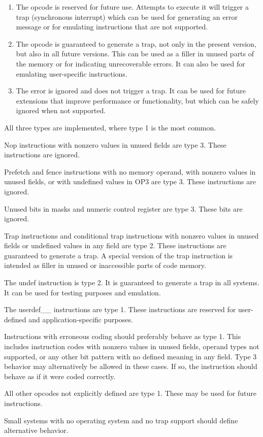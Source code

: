 \documentclass[forwardcom.tex]{subfiles}
\begin{document}
\begin{enumerate}
\item The opcode is reserved for future use. Attempts to execute it will trigger a trap (synchronous interrupt) which can be used for generating an error message or for emulating instructions that are not supported.
\item The opcode is guaranteed to generate a trap, not only in the present version, but also in all future versions. This can be used as a filler in unused parts of the memory or for indicating unrecoverable errors. It can also be used for emulating user-specific instructions.
\item The error is ignored and does not trigger a trap. It can be used for future extensions that improve performance or functionality, but which can be safely ignored when not supported.
\end{enumerate}

All three types are implemented, where type 1 is the most common.
\vspace{2mm}

Nop instructions with nonzero values in unused fields are type 3. These instructions are ignored.
\vspace{2mm}

Prefetch and fence instructions with no memory operand, with nonzero values in unused fields, or with undefined values in OP3 are type 3. These instructions are ignored.
\vspace{2mm}

Unused bits in masks and numeric control register are type 3. These bits are ignored.
\vspace{2mm}

Trap instructions and conditional trap instructions with nonzero values in unused fields or undefined values in any field are type 2. These instructions are guaranteed to generate a trap. A special version of the trap instruction is intended as filler in unused or inaccessible parts of code memory.
\vspace{2mm}

The undef instruction is type 2. It is guaranteed to generate a trap in all systems. It can be used for testing purposes and emulation.
\vspace{2mm}

The userdef\_\_ instructions are type 1. These instructions are reserved for user-defined and application-specific purposes.
\vspace{2mm}

Instructions with erroneous coding should preferably behave as type 1. This includes instruction codes with nonzero values in unused fields, operand types not supported, or any other bit pattern with no defined meaning in any field. Type 3 behavior may alternatively be allowed in these cases. If so, the instruction should behave as if it were coded correctly.
\vspace{2mm}

All other opcodes not explicitly defined are type 1. These may be used for future instructions.
\vspace{2mm}

Small systems with no operating system and no trap support should define alternative behavior.

 
\end{document}
